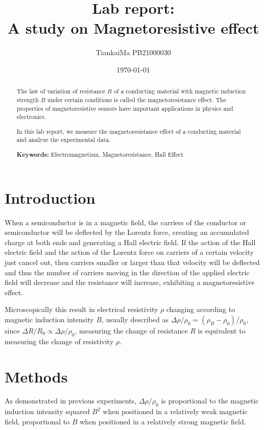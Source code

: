 \documentclass[a4paper]{article}
\title{Lab report:\\ A study on Magnetoresistive effect}
\author{TiankaiMa PB21000030}
\date{\today}
\begin{document}
\begin{multicols*}{2}
  \maketitle
  \begin{abstract}
    The law of variation of resistance $R$ of a conducting material with magnetic induction strength $B$ under certain conditions is called the magnetoresistance effect. The properties of magnetoresistive sensors have important applications in physics and electronics.

    In this lab report, we measure the magnetoresistance effect of a conducting material and analyze the experimental data.
    \par
    \textbf{Keywords:} Electromagnetism, Magnetoresistance, Hall Effect
  \end{abstract}
  \section*{Introduction}
  When a semiconductor is in a magnetic field, the carriers of the conductor or semiconductor will be deflected by the Lorentz force, creating an accumulated charge at both ends and generating a Hall electric field. If the action of the Hall electric field and the action of the Lorentz force on carriers of a certain velocity just cancel out, then carriers smaller or larger than that velocity will be deflected and thus the number of carriers moving in the direction of the applied electric field will decrease and the resistance will increase, exhibiting a magnetoresistive effect.

  Microscopically this result in electrical resistivity $\rho$ changing according to magnetic induction intensity $B$, usually described as $\Delta \rho/ \rho_0 = (\rho_B - \rho_0)/ \rho_0$, since $\Delta R / R_0 \propto \Delta \rho / \rho_0$, measuring the change of resistance $R$ is equivalent to measuring the change of resistivity $\rho$.

  \section*{Methods}

  As demonstrated in previous experiments, $\Delta \rho/\rho_0$ is proportional to the magnetic induction intensity squared $B^2$ when positioned in a relatively weak magnetic field, proportional to $B$ when positioned in a relatively strong magnetic field.


\end{multicols*}
\end{document}
